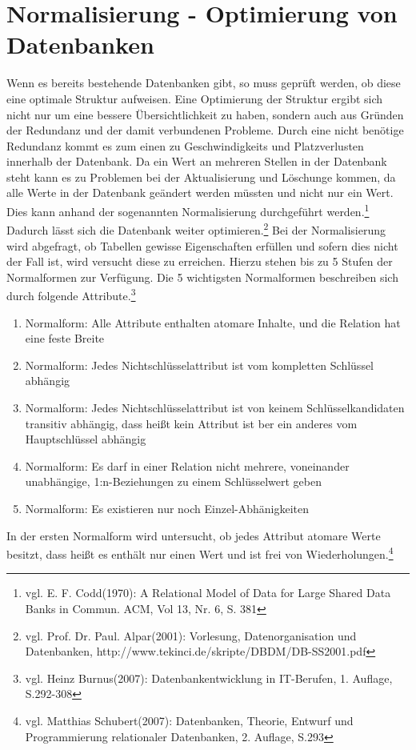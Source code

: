 \section{Normalisierung - Optimierung von Datenbanken}
\label{secNormalisierung}
Wenn es bereits bestehende Datenbanken gibt, so muss geprüft werden, ob diese eine optimale Struktur aufweisen.
Eine Optimierung der Struktur ergibt sich nicht nur um eine bessere Übersichtlichkeit zu haben, sondern auch aus Gründen der Redundanz und der damit verbundenen Probleme.
Durch eine nicht benötige Redundanz kommt es zum einen zu Geschwindigkeits und Platzverlusten innerhalb der Datenbank.
Da ein Wert an mehreren Stellen in der Datenbank steht kann es zu Problemen bei der Aktualisierung und Löschunge kommen, da alle Werte in der Datenbank geändert werden müssten und nicht nur ein Wert.
Dies kann anhand der sogenannten Normalisierung durchgeführt werden.\footnote{vgl. E. F. Codd(1970): A Relational Model of Data for Large Shared Data Banks in Commun. ACM, Vol 13, Nr. 6, S. 381} Dadurch lässt sich die Datenbank weiter optimieren.\footnote{vgl. Prof. Dr. Paul. Alpar(2001): Vorlesung, Datenorganisation und Datenbanken,  http://www.tekinci.de/skripte/DBDM/DB-SS2001.pdf}
Bei der Normalisierung wird abgefragt, ob Tabellen gewisse Eigenschaften erfüllen und sofern dies nicht der Fall ist, wird versucht diese zu erreichen.
Hierzu stehen bis zu 5 Stufen der Normalformen zur Verfügung.
Die 5 wichtigsten Normalformen beschreiben sich durch folgende Attribute.\footnote{vgl. Heinz Burnus(2007): Datenbankentwicklung in IT-Berufen, 1. Auflage, S.292-308}

\begin{enumerate}
\item Normalform: Alle Attribute enthalten atomare Inhalte, und die Relation hat eine feste Breite
\item Normalform: Jedes Nichtschlüsselattribut ist vom kompletten Schlüssel abhängig
\item Normalform: Jedes Nichtschlüsselattribut ist von keinem Schlüsselkandidaten transitiv abhängig, dass heißt kein Attribut ist ber ein anderes vom Hauptschlüssel abhängig
\item Normalform: Es darf in einer Relation nicht mehrere, voneinander unabhängige, 1:n-Beziehungen zu einem Schlüsselwert geben
\item Normalform: Es existieren nur noch Einzel-Abhänigkeiten
\end{enumerate}


In der ersten Normalform wird untersucht, ob jedes Attribut atomare Werte besitzt, dass heißt es enthält nur einen Wert und ist frei von Wiederholungen.\footnote{vgl. Matthias Schubert(2007): Datenbanken, Theorie, Entwurf und Programmierung relationaler Datenbanken, 2. Auflage, S.293}


